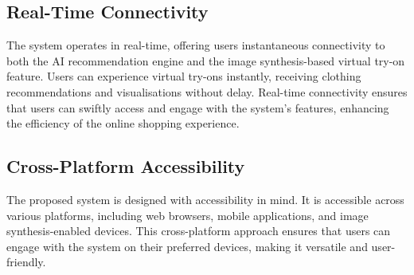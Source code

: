 	\subsection*{Real-Time Connectivity}
        The system operates in real-time, offering users instantaneous connectivity to both the AI recommendation engine and the image synthesis-based virtual try-on feature. Users can experience virtual try-ons instantly, receiving clothing recommendations and visualisations without delay. Real-time connectivity ensures that users can swiftly access and engage with the system's features, enhancing the efficiency of the online shopping experience.

	\subsection*{Cross-Platform Accessibility}
        The proposed system is designed with accessibility in mind. It is accessible across various platforms, including web browsers, mobile applications, and image synthesis-enabled devices. This cross-platform approach ensures that users can engage with the system on their preferred devices, making it versatile and user-friendly.
